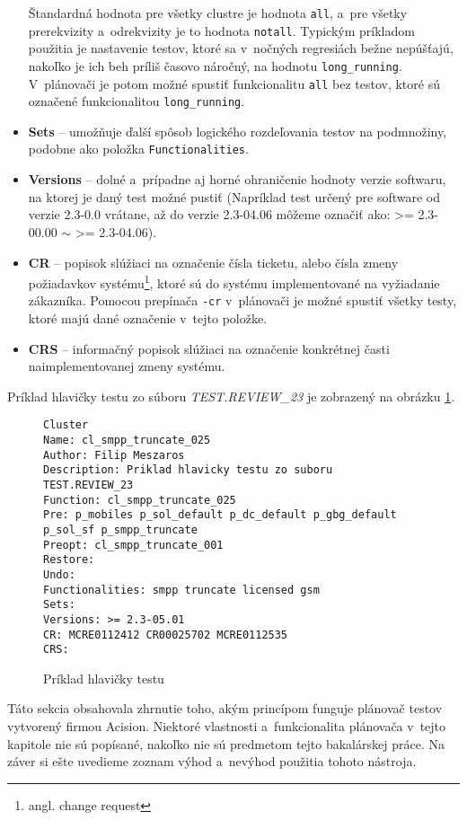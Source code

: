 \begin{itemize}
Štandardná hodnota pre všetky clustre je hodnota \texttt{all}, a~pre všetky prerekvizity a~odrekvizity je to hodnota \texttt{notall}.
Typickým príkladom použitia je nastavenie testov, ktoré sa v~nočných regresiách bežne nepúšťajú, 
nakoľko je ich beh príliš časovo náročný, na hodnotu \texttt{long\_running}.
V~plánovači je potom možné spustiť funkcionalitu \texttt{all} bez testov, ktoré sú označené funkcionalitou \texttt{long\_running}.
\item \textbf{Sets} -- umožňuje ďalší spôsob logického rozdeľovania testov na podmnožiny, podobne ako položka \texttt{Functionalities}.
\item \textbf{Versions} -- dolné a~prípadne aj horné ohraničenie hodnoty verzie softwaru, na ktorej je daný test možné pustiť
(Napríklad test určený pre software od verzie 2.3-0.0 vrátane, až do verzie 2.3-04.06 môžeme označiť ako: \textgreater= 2.3-00.00 $\sim$ \textgreater= 2.3-04.06).
\item \textbf{CR} -- popisok slúžiaci na označenie čísla ticketu, alebo čísla zmeny požiadavkov systému\footnote{angl. change request}, ktoré sú do systému implementované
na vyžiadanie zákazníka. 
Pomocou prepínača \texttt{-cr} v~plánovači je možné spustiť všetky testy, ktoré majú dané označenie v~tejto položke.
\item \textbf{CRS} -- informačný popisok slúžiaci na označenie konkrétnej časti naimplementovanej zmeny systému. 
\end{itemize}

Príklad hlavičky testu zo súboru \emph{TEST.REVIEW\_23} je zobrazený na obrázku \ref{obrazok:hlavicka_testu}.

\begin{figure}[h]
\begin{lstlisting}
Cluster
Name: cl_smpp_truncate_025
Author: Filip Meszaros
Description: Priklad hlavicky testu zo suboru TEST.REVIEW_23
Function: cl_smpp_truncate_025
Pre: p_mobiles p_sol_default p_dc_default p_gbg_default p_sol_sf p_smpp_truncate
Preopt: cl_smpp_truncate_001
Restore:
Undo:
Functionalities: smpp truncate licensed gsm
Sets:
Versions: >= 2.3-05.01
CR: MCRE0112412 CR00025702 MCRE0112535
CRS:
\end{lstlisting}
\caption{Príklad hlavičky testu}
\label{obrazok:hlavicka_testu}
\end{figure}


Táto sekcia obsahovala zhrnutie toho, akým princípom funguje plánovač testov vytvorený firmou Acision.
Niektoré vlastnosti a~funkcionalita plánovača v~tejto kapitole nie sú popísané, nakoľko nie sú predmetom tejto bakalárskej práce. 
Na záver si ešte uvedieme zoznam výhod a~nevýhod použitia tohoto nástroja.

